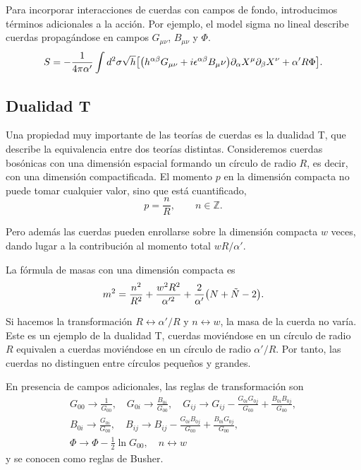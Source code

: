 
Para incorporar interacciones de cuerdas con campos de fondo, introducimos términos adicionales a la acción.
Por ejemplo, el model sigma no lineal describe cuerdas propagándose en campos $G_{\mu\nu}$, $B_{\mu\nu}$ y $\Phi$.
\begin{equation}
  S = -\frac{1}{4\pi \alpha'}\int d^2 \sigma \sqrt h \qty[\qty(h^{\alpha\beta}G_{\mu\nu} + i\epsilon^{\alpha\beta}B_\mu\nu)\partial_\alpha X^\mu
  \partial_\beta X^\nu +\alpha'R\Phi].
\end{equation}

\subsection{Dualidad T}

Una propiedad muy importante de las teorías de cuerdas es la dualidad T,
que describe la equivalencia entre dos teorías distintas.
Consideremos cuerdas bosónicas con una dimensión espacial formando un círculo de radio $R$,
es decir, con una dimensión compactificada.
El momento $p$ en la dimensión compacta no puede tomar cualquier valor, sino que está cuantificado,
\begin{equation}
  p = \frac{n}{R}, \qquad n \in \mathbb Z.
\end{equation}

Pero además las cuerdas pueden enrollarse sobre la dimensión compacta $w$ veces, dando lugar
a la contribución al momento total $wR/\alpha'$.

La fórmula de masas con una dimensión compacta es
\begin{equation}
  m^2 = \frac{n^2}{R^2} + \frac{w^2 R^2}{\alpha'^2} +\frac{2}{\alpha'}\qty(N+\tilde N -2).
\end{equation}

Si hacemos la transformación $R\leftrightarrow \alpha'/R$ y $n\leftrightarrow w$, la
masa de la cuerda no varía. 
Este es un ejemplo de la dualidad T, cuerdas moviéndose en un círculo de radio $R$ equivalen
a cuerdas moviéndose en un círculo de radio $\alpha'/R$.
Por tanto, las cuerdas no distinguen entre círculos pequeños y grandes.

En presencia de campos adicionales, las reglas de transformación son
\begin{equation}
  \begin{gathered}
    G_{00}\to \frac{1}{G_{00}}, \quad G_{0i}\to \frac{B_{0i}}{G_{00}},\quad G_{ij}\to G_{ij} -\frac{G_{0i}G_{0j}}{G_{00}}+\frac{B_{0i}B_{0j}}{G_{00}}, \\
    B_{0i}\to\frac{G_{0i}}{G_{00}},\quad B_{ij}\to B_{ij}-\frac{G_{0i}B_{0j}}{G_{00}}+\frac{B_{0i}G_{0j}}{G_{00}},\\
    \Phi\to\Phi-\frac{1}{2}\ln G_{00},\quad n\leftrightarrow w
  \end{gathered}
\end{equation}
y se conocen como reglas de Busher.


